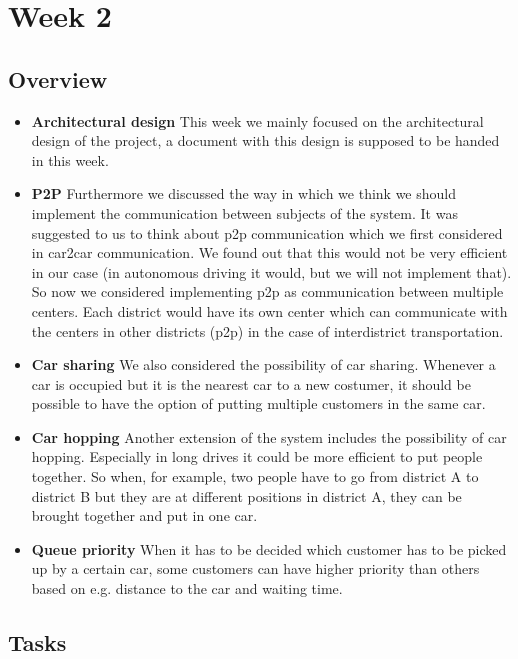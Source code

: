 \documentclass[a4paper]{article}
\begin{document}
\section*{Week 2}
\subsection*{Overview}
\begin{itemize}
	\item \textbf{Architectural design} This week we mainly focused on the architectural design of the project, a document with this design is supposed to be handed in this week.
	\item \textbf{P2P}  Furthermore we discussed the way in which we think we should implement the communication between subjects of the system. It was suggested to us to think about p2p communication which we first considered in car2car communication. We found out that this would not be very efficient in our case (in autonomous driving it would, but we will not implement that). So now we considered implementing p2p as communication between multiple centers. Each district would have its own center which can communicate with the centers in other districts (p2p) in the case of interdistrict transportation.  
	\item \textbf{Car sharing} We also considered the possibility of car sharing. Whenever a car is occupied but it is the nearest car to a new costumer, it should be possible to have the option of putting multiple customers in the same car. 
	\item \textbf{Car hopping} Another extension of the system includes the possibility of car hopping. Especially in long drives it could be more efficient to put people together. So when, for example, two people have to go from district A to district B but they are at different positions in district A, they can be brought together and put in one car.
	\item \textbf{Queue priority} When it has to be decided which customer has to be picked up by a certain car, some customers can have higher priority than others based on e.g. distance to the car and waiting time. 
	
\end{itemize}


\subsection*{Tasks}
\end{document}
